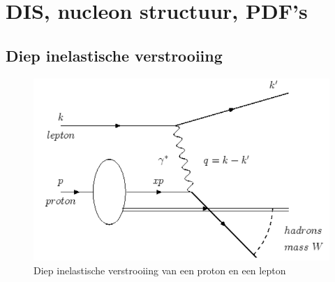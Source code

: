 \documentclass[../main.tex]{subfiles}
\begin{document}
\section{DIS, nucleon structuur, PDF's}%
\label{sec:dis_nucleon_structuur_pdf_s}

\subsection{Diep inelastische verstrooiing}%
\label{sub:diep_inelastische_verstrooiing}

\begin{figure}[h]
    \centering
    \includegraphics[width=0.8\linewidth]{DIS_nucleon_structuur_pdf/diep_in_ver.png}
    \caption{Diep inelastische verstrooiing van een proton en een lepton}%
    \label{fig:diep_in_ver}
\end{figure}
\end{document}
